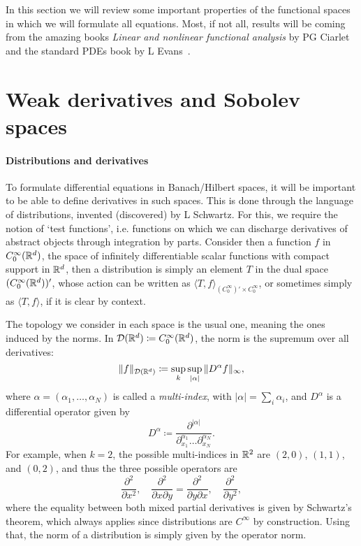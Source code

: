 In this section we will review some important properties of the functional spaces in which we will formulate all equations. Most, if not all, results will be coming from the amazing books \textit{Linear and nonlinear functional analysis} by PG Ciarlet~\cite{ciarlet2013linear} and the standard PDEs book by L Evans~\cite{evans2022partial}.
\section{Weak derivatives and Sobolev spaces}
\paragraph{Distributions and derivatives} 
{\color{blue}
To formulate differential equations in Banach/Hilbert spaces, it will be important to be able to define derivatives in such spaces. This is done through the language of distributions, invented (discovered) by L Schwartz. For this, we require the notion of `test functions', i.e. functions on which we can discharge derivatives of abstract objects through integration by parts. Consider then a function $f$ in $C_0^\infty(\mathbb{R}^d)$, the space of infinitely differentiable scalar functions with compact support in $\mathbb{R}^d$, then a distribution is simply an element $T$ in the dual space $(C_0^\infty(\mathbb{R}^d))'$, whose action can be written as $\langle T, f\rangle_{(C_0^\infty)'\times C_0^\infty}$, or sometimes simply as $\langle T, f\rangle$, if it is clear by context. 

The topology we consider in each space is the usual one, meaning the ones induced by the norms. In $\mathcal D(\mathbb{R}^d)\coloneqq C_0^\infty(\mathbb{R}^d)$, the norm is the supremum over all derivatives:
\begin{equation} %
    \| f \|_{\mathcal D(\R^d)} \coloneqq \sup_{k} \sup_{|\alpha|} \|D^\alpha f\|_\infty,
\end{equation}
where $\alpha=(\alpha_1, \hdots, \alpha_N)$ is called a \textit{multi-index}, with $|\alpha| = \sum_i \alpha_i$, and $D^\alpha$ is a differential operator given by 
\begin{equation}
    D^\alpha \coloneqq \frac{\partial^{|\alpha|}}{\partial^{\alpha_1}_{x_1}\hdots \partial^{\alpha_N}_{x_N}}.
\end{equation}
For example, when $k=2$, the possible multi-indices in $\mathbb{R}^2$ are $(2,0)$, $(1,1)$, and $(0,2)$, and thus the three possible operators are
\begin{equation*}
    \frac{\partial^2}{\partial x^2},\quad  \frac{\partial^2}{\partial x\partial y} = \frac{\partial^2}{\partial y\partial x},\quad \frac{\partial^2}{\partial y^2},
\end{equation*}
where the equality between both mixed partial derivatives is given by Schwartz's theorem, which always applies since distributions are $C^\infty$ by construction. 
Using that, the norm of a distribution is simply given by the operator norm. }

